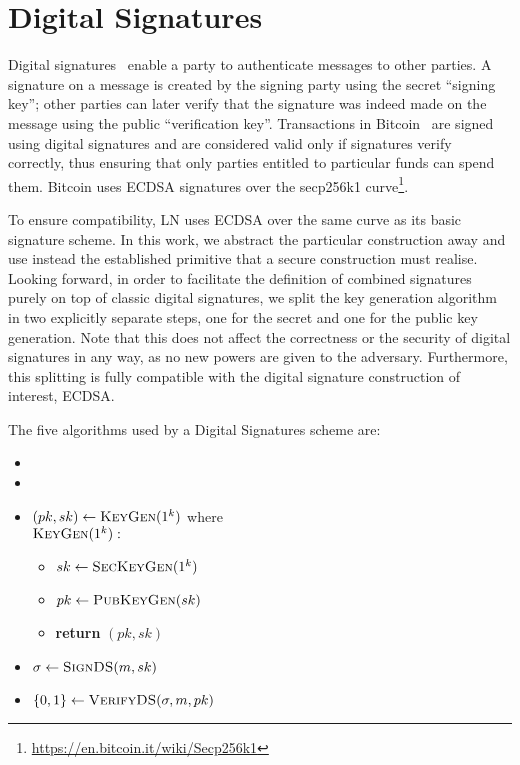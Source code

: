 \section{Digital Signatures}
\label{sec:ds}
  Digital signatures~\cite{katzlindell} enable a party to authenticate messages
  to other parties. A signature on a message is created by the signing party
  using the secret ``signing key''; other parties can later verify that the
  signature was indeed made on the message using the public ``verification
  key''. Transactions in Bitcoin~\cite{bitcoin} are signed using digital
  signatures and are considered valid only if signatures verify correctly, thus
  ensuring that only parties entitled to particular funds can spend them.
  Bitcoin uses ECDSA signatures over the secp256k1
  curve\footnote{\url{https://en.bitcoin.it/wiki/Secp256k1}}.

  To ensure compatibility, LN uses ECDSA over the same curve as its basic
  signature scheme. In this work, we abstract the particular construction away
  and use instead the established primitive that a secure construction must
  realise. Looking forward, in order to facilitate the definition of combined
  signatures purely on top of classic digital signatures, we split the key
  generation algorithm in two explicitly separate steps, one for the secret and
  one for the public key generation. Note that this does not affect the
  correctness or the security of digital signatures in any way, as no new powers
  are given to the adversary. Furthermore, this splitting is fully compatible
  with the digital signature construction of interest, ECDSA.

  The five algorithms used by a Digital Signatures scheme are:
  \begin{itemize}
    \item {}
    \item {}
    \item $(pk, sk) \gets \textsc{KeyGen}(1^k)$ where \\
    $\textsc{KeyGen}(1^k):$
    \begin{itemize}[label={}]
      \item $sk \gets \textsc{SecKeyGen}(1^k)$
      \item $pk \gets \textsc{PubKeyGen}(sk)$
      \item \textbf{return} $(pk, sk)$
    \end{itemize}
    \item $\sigma \gets \textsc{SignDS}(m, sk)$
    \item $\{0, 1\} \gets \textsc{VerifyDS}(\sigma, m, pk)$
  \end{itemize}

